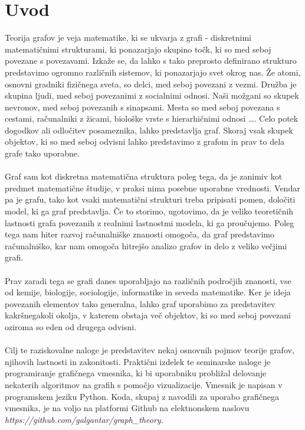 \documentclass[11pt]{article}
\begin{document}
\null
\newpage
\null
\newpage


\tableofcontents %
\listoffigures %
\lstlistoflistings %
\newpage


\section{Uvod}

Teorija grafov je veja matematike, ki se ukvarja z grafi - diskretnimi matematičnimi strukturami, ki ponazarjajo skupino točk, ki so med seboj povezane s povezavami. Izkaže se, da lahko s tako preprosto definirano strukturo predstavimo ogromno različnih sistemov, ki ponazarjajo svet okrog nas. Že atomi, osnovni gradniki fizičnega sveta, so delci, med seboj povezani z vezmi. Družba je skupina ljudi, med seboj povezanimi z socialnimi odnosi. Naši možgani so skupek nevronov, med seboj povezanih s sinapsami. Mesta so med seboj povezana s cestami, računalniki z žicami, biološke vrste s hierarhičnimi odnosi \dots . Celo potek dogodkov ali odločitev posameznika, lahko predstavlja graf. Skoraj vsak skupek objektov, ki so med seboj odvisni lahko predstavimo z grafom in prav to dela grafe tako uporabne.
\\ \\
Graf sam kot diskretna matematična struktura poleg tega, da je zanimiv kot predmet matematične študije, v praksi nima posebne uporabne vrednosti. Vendar pa je grafu, tako kot vsaki matematični strukturi treba pripisati pomen, določiti model, ki ga graf predstavlja. Če to storimo, ugotovimo, da je veliko teoretičnih lastnosti grafa povezanih z realnimi lastnostmi modela, ki ga proučujemo. Poleg tega nam hiter razvoj računalniške znanosti omogoča, da graf predstavimo računalniško, kar nam omogoča hitrejšo analizo grafov in delo z veliko večjimi grafi.
\\ \\
Prav zaradi tega se grafi danes uporabljajo na različnih področjih znanosti, vse od kemije, biologije, sociologije, informatike in seveda matematike. Ker je ideja povezanih elementov tako generalna, lahko graf uporabimo za predstavitev kakršnegakoli okolja, v katerem obstaja več objektov, ki so med seboj povezani oziroma so eden od drugega odvisni.
\\ \\
Cilj te raziskovalne naloge je predstavitev nekaj osnovnih pojmov teorije grafov, njihovih lastnosti in zakonitosti. Praktični izdelek te seminarske naloge je programiranje grafičnega vmesnika, ki bi uporabniku probližal delovanje nekaterih algoritmov na grafih s pomočjo vizualizacije. Vmesnik je napisan v programskem jeziku Python. Koda, skupaj z navodili za uporabo grafičnega vmesnika, je na voljo na platformi Github na elektnonskem naslovu \textit{https://github.com/galgantar/graph\_theory}.
\end{document}
